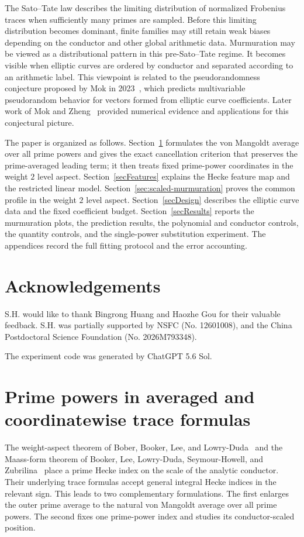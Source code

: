 \documentclass[12pt,reqno]{amsart}
\numberwithin{equation}{section}
\theoremstyle{plain}
\theoremstyle{definition}
\theoremstyle{remark}
\begin{document}
The Sato--Tate law describes the limiting distribution of normalized Frobenius traces when sufficiently many primes are sampled.
Before this limiting distribution becomes dominant, finite families may still retain weak biases depending on the conductor and other global arithmetic data.
Murmuration may be viewed as a distributional pattern
in this pre-Sato--Tate regime.
It becomes visible when elliptic curves are ordered by conductor and separated according to an arithmetic
label.
This viewpoint is related to the pseudorandomness conjecture proposed by Mok in 2023~\cite{Mok2023}, which predicts multivariable pseudorandom behavior for vectors formed from elliptic curve coefficients.
Later work of Mok and Zheng~\cite{MokZheng2025a,MokZheng2025b} provided numerical evidence and applications for this conjectural picture.

The paper is organized as follows.  Section~\ref{secPrimePowerMainTerm} formulates the von Mangoldt average over all prime powers and gives the exact cancellation criterion that preserves the prime-averaged leading term; it then treats fixed prime-power coordinates in the weight $2$ level aspect.
Section~\ref{secFeatures} explains the Hecke feature map and the restricted linear model.
Section~\ref{sec:scaled-murmuration} proves the common profile in the weight $2$ level aspect.
Section~\ref{secDesign} describes the elliptic curve data and the fixed coefficient budget.  Section~\ref{secResults} reports the murmuration plots, the prediction results, the polynomial and conductor controls, the quantity controls, and the single-power substitution experiment.
The appendices record the full fitting protocol and the error accounting.


\section*{Acknowledgements}
S.H. would like to thank Bingrong Huang and Haozhe Gou for their valuable feedback.
S.H. was partially supported by NSFC (No. 12601008), and the China Postdoctoral Science Foundation (No. 2026M793348).

The experiment code was generated by ChatGPT 5.6 Sol.

\section{Prime powers in averaged and coordinatewise trace formulas}
\label{secPrimePowerMainTerm}

The weight-aspect theorem of Bober, Booker, Lee, and Lowry-Duda~\cite[Theorem~1.1]{BBLLD2026} and the Maass-form theorem of Booker, Lee, Lowry-Duda, Seymour-Howell, and Zubrilina~\cite[Theorem~1.1]{BLLDSHZ2024} place a prime Hecke index on the scale of the analytic conductor.
Their underlying trace formulas accept general integral Hecke indices in the relevant sign.
This leads to two complementary formulations.
The first enlarges the outer prime average to the natural von Mangoldt average over all prime powers.
The second fixes one prime-power index and studies its conductor-scaled position.
\end{document}
